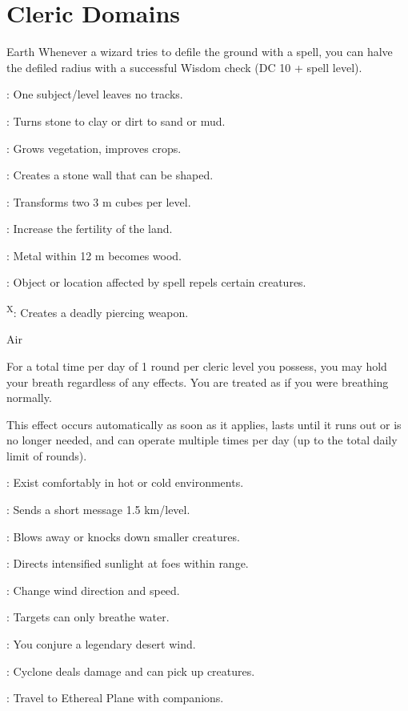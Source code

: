 \section{Cleric Domains}

{Earth}
{Whenever a wizard tries to defile the ground with a spell, you can halve the defiled radius with a successful Wisdom check (DC 10 + spell level).}
{
	\item {}: One subject/level leaves no tracks.
	\item {}: Turns stone to clay or dirt to sand or mud.
	\item {}: Grows vegetation, improves crops.
	\item {}: Creates a stone wall that can be shaped.
	\item {}: Transforms two 3 m cubes per level.
	\item {}: Increase the fertility of the land.
	\item {}: Metal within 12 m becomes wood.
	\item {}: Object or location affected by spell repels certain creatures.
	\item {}\textsuperscript{X}: Creates a deadly piercing weapon.
}

{Air}
{For a total time per day of 1 round per cleric level you possess, you may hold your breath regardless of any effects. You are treated as if you were breathing normally.

This effect occurs automatically as soon as it applies, lasts until it runs out or is no longer needed, and can operate multiple times per day (up to the total daily limit of rounds).}
{
	\item {}: Exist comfortably in hot or cold environments.
	\item {}: Sends a short message 1.5 km/level.
	\item {}: Blows away or knocks down smaller creatures.
	\item {}: Directs intensified sunlight at foes within range.
	\item {}: Change wind direction and speed.
	\item {}: Targets can only breathe water.
	\item {}: You conjure a legendary desert wind.
	\item {}: Cyclone deals damage and can pick up creatures.
	\item {}: Travel to Ethereal Plane with companions.
}

